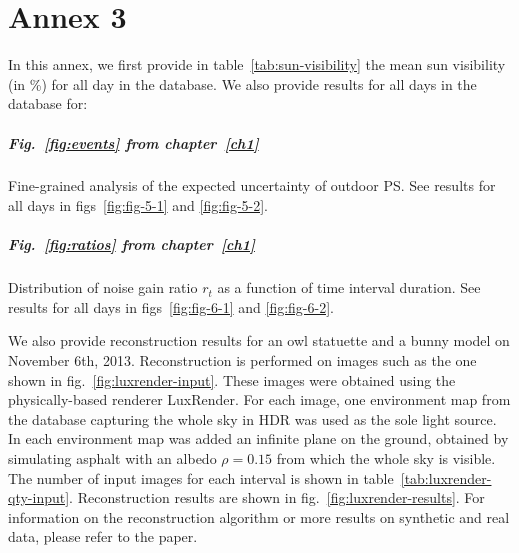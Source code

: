 \chapter{Annex 3}     %
\label{annex3}

\graphicspath{{annex3_figures/}}


In this annex, we first provide in table~\ref{tab:sun-visibility} the mean sun visibility (in \%) for all day in the database. We also provide results for all days in the database for: 
\vspace{-.5em}
\paragraph{Fig.~\ref{fig:events} from chapter~\ref{ch1}} Fine-grained analysis of the expected uncertainty of outdoor PS. See results for all days in figs~\ref{fig:fig-5-1} and \ref{fig:fig-5-2}.


\paragraph{Fig.~\ref{fig:ratios} from chapter~\ref{ch1}} Distribution of noise gain ratio $r_t$ as a function of time interval duration. See results for all days in figs~\ref{fig:fig-6-1} and \ref{fig:fig-6-2}.

\vspace{1em}


We also provide reconstruction results for an owl statuette and a bunny model on November 6th, 2013. Reconstruction is performed on images such as the one shown in fig.~\ref{fig:luxrender-input}. These images were obtained using the physically-based renderer LuxRender. For each image, one environment map from the database capturing the whole sky in HDR was used as the sole light source. In each environment map was added an infinite plane on the ground, obtained by simulating asphalt with an albedo $\rho = 0.15$ from which the whole sky is visible. The number of input images for each interval is shown in table~\ref{tab:luxrender-qty-input}. Reconstruction results are shown in fig.~\ref{fig:luxrender-results}. For information on the reconstruction algorithm or more results on synthetic and real data, please refer to the paper.


